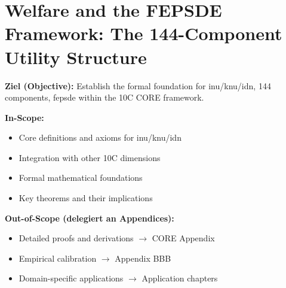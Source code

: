 %
%
%
%

\chapter{Welfare and the FEPSDE Framework: The 144-Component Utility Structure}
\label{ch:welfare-fepsde}

\begin{tcolorbox}[
    colback=purple!5!white,
    colframe=purple!75!black,
    title={\textbf{Chapter Scope: Ziel / In-Scope / Out-of-Scope}},
    fonttitle=\bfseries
]

\textbf{Ziel (Objective):}
Establish the formal foundation for inu/knu/idn, 144 components, fepsde within the 10C CORE framework.

\vspace{0.3cm}
\textbf{In-Scope:}
\begin{itemize}[nosep]
    \item Core definitions and axioms for inu/knu/idn
    \item Integration with other 10C dimensions
    \item Formal mathematical foundations
    \item Key theorems and their implications
\end{itemize}

\vspace{0.3cm}
\textbf{Out-of-Scope (delegiert an Appendices):}
\begin{itemize}[nosep]
    \item Detailed proofs and derivations $\rightarrow$ CORE Appendix
    \item Empirical calibration $\rightarrow$ Appendix BBB
    \item Domain-specific applications $\rightarrow$ Application chapters
\end{itemize}

\end{tcolorbox}



